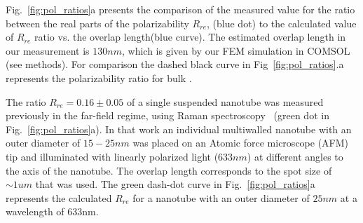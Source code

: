 \documentclass[journal=jacsat,manuscript=article]{achemso}
\begin{document}
Fig.~\ref{fig:pol_ratios}a presents the comparison of the measured value for the ratio between the real parts of the polarizability $R_{re}$, (blue dot) to the calculated value of $R_{re}$ ratio vs. the overlap length(blue curve). The estimated overlap length in our measurement is $130nm$, which is given by our FEM simulation in COMSOL (see methods).
For comparison the dashed black curve in Fig~\ref{fig:pol_ratios}.a represents the polarizability ratio for bulk .

The ratio $R_{re}=0.16\pm0.05$ of a single suspended nanotube was measured previously in the far-field regime, using Raman spectroscopy~\cite{tenne2005orientation} (green dot in Fig.~\ref{fig:pol_ratios}a). In that work an individual multiwalled  nanotube with an outer diameter of $15-25nm$ was placed on an Atomic force microscope (AFM) tip and illuminated with linearly polarized light ($633nm$) at different angles to the axis of the nanotube. The overlap length corresponds to the spot size of $\sim1um$ that was used.
The green dash-dot curve in Fig.~\ref{fig:pol_ratios}a represents the calculated $R_{re}$ for a nanotube with an outer diameter of $25nm$ at a wavelength of $633$nm.
\end{document}
